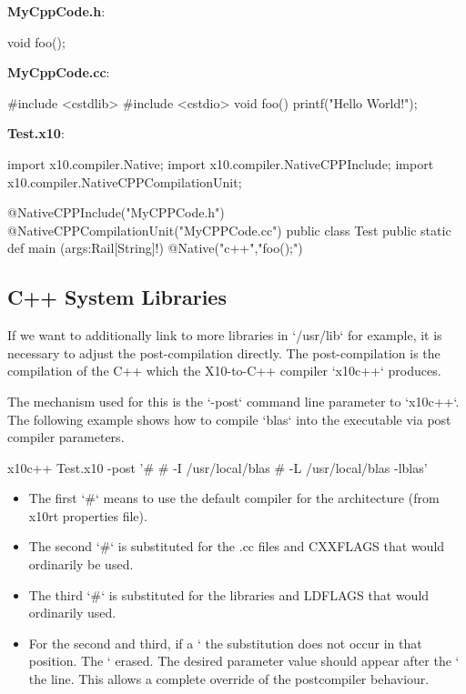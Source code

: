 {\bf MyCppCode.h}: 
\begin{xten}
void foo();
\end{xten}


{\bf MyCppCode.cc}:
\begin{xten}
#include <cstdlib>
#include <cstdio>
void foo() {
    printf("Hello World!\n");
}
\end{xten}

{\bf Test.x10}:
\begin{xten}
import x10.compiler.Native;
import x10.compiler.NativeCPPInclude;
import x10.compiler.NativeCPPCompilationUnit;

@NativeCPPInclude("MyCPPCode.h")
@NativeCPPCompilationUnit("MyCPPCode.cc")
public class Test {
    public static def main (args:Rail[String]!) {
        { @Native("c++","foo();") {} }
    }
}
\end{xten}

\subsection{C++ System Libraries}

If we want to additionally link to more libraries in \xcd`/usr/lib` for
example, it is necessary to adjust the post-compilation directly.  The
post-compilation is the compilation of the C++ which the X10-to-C++ compiler
\xcd`x10c++` produces.  

The mechanism used for this is the \xcd`-post` command line parameter to
\xcd`x10c++`. The following example shows how to compile \xcd`blas` into the
executable via post compiler parameters.

\begin{xten}
x10c++ Test.x10 -post '# # -I /usr/local/blas # -L /usr/local/blas -lblas'
\end{xten}

\begin{itemize}
\item The first \xcd`#` means to use the default compiler for the architecture (from
      x10rt properties file). 
\item The second \xcd`#` is substituted for the .cc files and CXXFLAGS that would
      ordinarily be used. 
\item The third \xcd`#` is substituted for the libraries and LDFLAGS that would
      ordinarily used.
\item For the second and third, if a \xcd`%
      the substitution does not occur in that position.  The \xcd`%
      erased.  The desired parameter value should appear after the \xcd`%
      the line. This allows a complete override of the postcompiler behaviour.
\end{itemize}


